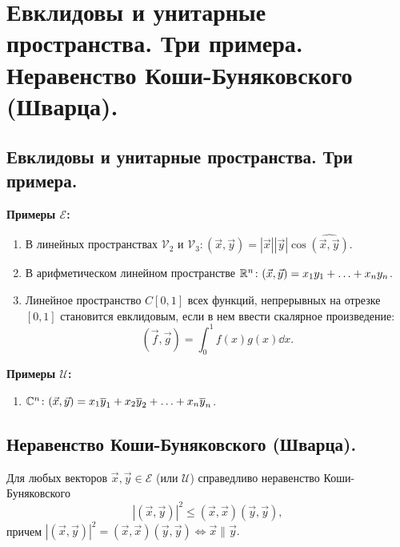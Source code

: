\section{
    Евклидовы и унитарные пространства. Три примера. Неравенство Коши-Буняковского (Шварца).
}

\subsection{
    Евклидовы и унитарные пространства. Три примера.
}

\textbf{Примеры $\mathcal{E}$:}
\begin{enumerate}
    \item В линейных пространствах $\mathcal{V}_2$ и $\mathcal{V}_3 \colon (\vec{x}, \vec{y}) = |\vec{x}||\vec{y}|\cos \widehat{(\vec{x}, \vec{y})}$.
    \item В арифметическом линейном пространстве $\mathbb{R}^n \colon (\vec{x}, \vec{y}) = x_1y_1 + \ldots + x_ny_n$. 
    \item Линейное пространство $C[0, 1]$ всех функций, непрерывных на отрезке $[0, 1]$ становится евклидовым, если в нем ввести скалярное произведение:
    $$(\vec{f}, \vec{g}) = \int_{0}^{1} f(x)g(x) \dd x.$$
\end{enumerate}

\textbf{Примеры $\mathcal{U}$:}

\begin{enumerate}
    \item $\mathbb{C}^n \colon (\vec{x}, \vec{y}) = x_1\overline{y}_1 + x_2\overline{y}_2 + \ldots + x_n\overline{y}_n$.
\end{enumerate}


\newpage


\subsection{
    Неравенство Коши-Буняковского (Шварца).
}

\begin{theorem}
    Для любых векторов $\vec{x}, \vec{y} \in \mathcal{E}$ (или $\mathcal{U}$) справедливо неравенство Коши-Буняковского
    $$|(\vec{x}, \vec{y})|^2 \leq (\vec{x}, \vec{x}) (\vec{y}, \vec{y}),$$
    причем $|(\vec{x}, \vec{y})|^2 = (\vec{x}, \vec{x}) (\vec{y}, \vec{y}) \iff \vec{x} \parallel \vec{y}.$
\end{theorem}

